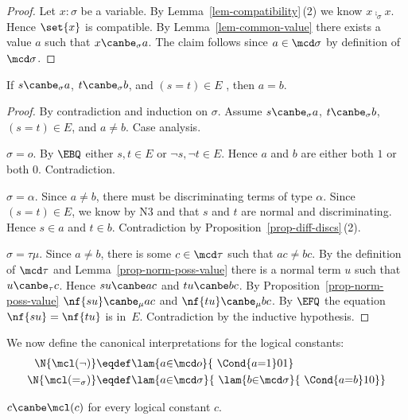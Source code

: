 \begin{proof}
  Let $x:\sigma$ be a variable.  By
  Lemma~\ref{lem-compatibility}\,(2) we know $x\comp_\sigma x$.
  Hence $\set{x}$ is compatible.  By
  Lemma~\ref{lem-common-value} there exists a value $a$
  such that $x\canbe_\sigma a$.  The claim follows
  since $a\in\mcd\sigma$ by definition of $\mcd\sigma$.
\end{proof}

\begin{lem}[Functionality]
  \label{lem-functionality}
  If $s\canbe_\sigma a$, $t\canbe_\sigma b$, and
  $(s{=}t)\in E$ , then $a=b$.
\end{lem}

\begin{proof}
  By contradiction and induction on $\sigma$.  Assume
  $s\canbe_\sigma a$, $t\canbe_\sigma b$, $(s{=}t)\in
  E$, and $a\neq b$.  Case analysis.

  $\sigma=o$.  By $\EBQ$ either $s,t\in E$ or $\neg
  s,\neg t\in E$.  Hence $a$ and $b$ are either both
  $1$ or both $0$.  Contradiction.

  $\sigma=\alpha$.  Since $a\neq b$, there must be
  discriminating terms of type $\alpha$.  Since
  $(s{=}t)\in E$, we know by N3 and \ECon that $s$ and
  $t$ are normal and discriminating.  Hence $s\in a$
  and $t\in b$.  Contradiction by
  Proposition~\ref{prop-diff-discs}\,(2).

  $\sigma = \tau\mu$.  Since $a\neq b$, there is some
  $c\in\mcd\tau$ such that $ac\not= bc$.
  By the
  definition of $\mcd\tau$ and
  Lemma~\ref{prop-norm-poss-value} there is a normal
  term $u$ such that $u\canbe_\tau c$.
  Hence $su\canbe ac$ and $tu\canbe bc$.  By
  Proposition~\ref{prop-norm-poss-value} $\nf{su}\canbe_\mu
  ac$ and $\nf{tu}\canbe_\mu bc$.
  By $\EFQ$ the
  equation $\nf{su} = \nf{tu}$ is in~$E$.
  Contradiction by the inductive hypothesis.
\end{proof}

We now define the canonical interpretations for the logical constants:
\begin{align*}
\N{\mcl({\neg})}&\eqdef\lam{a{\in}\mcd o}{~\Cond{a{=}1}01}\\ \N{\mcl({=_\sigma})}&\eqdef\lam{a{\in}\mcd\sigma}{~\lam{b{\in}\mcd\sigma}{~\Cond{a{=}b}10}}
\end{align*}

\begin{lem}
  \label{lem-log-constants}
  $c\canbe\mcl(c)$ for every logical constant $c$.
\end{lem}

